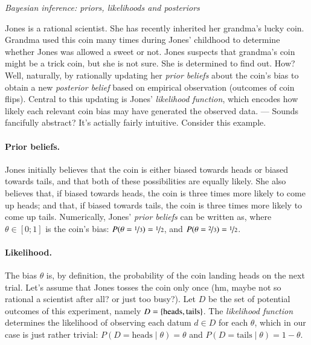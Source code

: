 \documentclass[nobib]{tufte-handout}
\begin{document}
\begin{InfoBox}[t]
\centering
\colorbox{mygray}{\centering
  \begin{minipage}{1.0\textwidth}

    \emph{Bayesian inference: priors, likelihoods and posteriors}
    \medskip

    Jones is a rational scientist. She has recently inherited her grandma's lucky coin. Grandma
    used this coin many times during Jones' childhood to determine whether Jones was allowed a
    sweet or not. Jones suspects that grandma's coin might be a trick coin, but she is not
    sure. She is determined to find out. How? Well, naturally, by rationally updating her
    \emph{prior beliefs} about the coin's bias to obtain a new \emph{posterior belief} based on
    empirical observation (outcomes of coin flips). Central to this updating is Jones'
    \emph{likelihood function}, which encodes how likely each relevant coin bias may have
    generated the observed data. --- Sounds fancifully abstract? It's actially fairly intuitive.
    Consider this example.
    
    \paragraph{Prior beliefs.} Jones initially believes that the coin is either biased towards
    heads or biased towards tails, and that both of these possibilities are equally likely. She
    also believes that, if biased towards heads, the coin is three times more likely to come up
    heads; and that, if biased towards tails, the coin is three times more likely to come up
    tails. Numerically, Jones' \emph{prior beliefs} can be written as, where $\theta \in [0;1]$
    is the coin's bias: $P(\theta = \nicefrac{1}{3}) = \nicefrac{1}{2}$, and $P(\theta =
    \nicefrac{2}{3}) = \nicefrac{1}{2}$.

    \paragraph{Likelihood.} The bias $\theta$ is, by definition, the probability of the coin
    landing heads on the next trial. Let's assume that Jones tosses the coin only once (hm,
    maybe not so rational a scientist after all? or just too busy?). Let $D$ be the set of
    potential outcomes of this experiment, namely $D = \left\{\text{heads}, \text{tails}\right\}$. The
    \emph{likelihood function} determines the likelihood of observing each datum $d \in D$ for
    each $\theta$, which in our case is just rather trivial: $P(D = \text{heads} \mid \theta) =
    \theta$ and $P(D = \text{tails} \mid \theta) = 1 - \theta$.


\end{minipage}}
\end{InfoBox}
\end{document}
